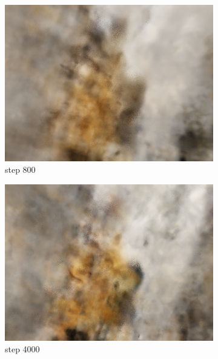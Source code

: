 \documentclass[12pt]{article}
\begin{document}
  \begin{figure}[h]
      \centering
      \begin{subfigure}{0.3\textwidth}
            \centering
            \includegraphics[width=\textwidth]{./images/nerf_pred/nerf_800.png}
            \caption{step 800}
        \end{subfigure}
        \hfill
        \begin{subfigure}{0.3\textwidth}
            \centering
            \includegraphics[width=\textwidth]{./images/nerf_pred/nerf_4000.png}
            \caption{step 4000}
        \end{subfigure}
        \hfill
        \begin{subfigure}{0.3\textwidth}

\end{subfigure}
\end{figure}
\end{document}
